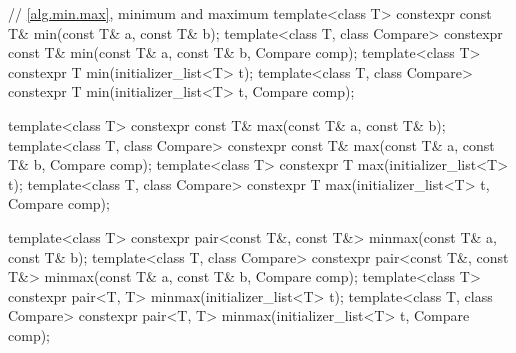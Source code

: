 \begin{codeblock}
{  // \ref{alg.min.max}, minimum and maximum
  template<class T> constexpr const T& min(const T& a, const T& b);
  template<class T, class Compare>
    constexpr const T& min(const T& a, const T& b, Compare comp);
  template<class T>
    constexpr T min(initializer_list<T> t);
  template<class T, class Compare>
    constexpr T min(initializer_list<T> t, Compare comp);

  template<class T> constexpr const T& max(const T& a, const T& b);
  template<class T, class Compare>
    constexpr const T& max(const T& a, const T& b, Compare comp);
  template<class T>
    constexpr T max(initializer_list<T> t);
  template<class T, class Compare>
    constexpr T max(initializer_list<T> t, Compare comp);

  template<class T> constexpr pair<const T&, const T&> minmax(const T& a, const T& b);
  template<class T, class Compare>
    constexpr pair<const T&, const T&> minmax(const T& a, const T& b, Compare comp);
  template<class T>
    constexpr pair<T, T> minmax(initializer_list<T> t);
  template<class T, class Compare>
    constexpr pair<T, T> minmax(initializer_list<T> t, Compare comp);

}
\end{codeblock}
